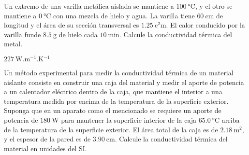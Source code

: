 \setcounter{figure}{0}
%
\begin{Exercise}
  {}{}
  Un extremo de una varilla metálica aislada se mantiene a $\SI{100}{\celsius}$, y el otro se mantiene a $\SI{0}{\celsius}$ con una mezcla de hielo y agua. La varilla tiene $\SI{60}{\centi\metre}$ de longitud y el área de su sección transversal es $\SI{1.25}{\square\centi\metre}$. El calor conducido por la varilla funde $\SI{8.5}{\gram}$ de hielo cada $\SI{10}{\minute}$. Calcule la conductividad térmica del metal.
\end{Exercise}
\begin{Answer}
  $\SI{227}{\watt.\metre^{-1}.\kelvin^{-1}}$
\end{Answer}
%
%
\begin{Exercise}
  Un método experimental para medir la conductividad térmica de un material aislante consiste en construir una caja del material y medir el aporte de potencia a un calentador eléctrico dentro de la caja, que mantiene el interior a una temperatura medida por encima de la temperatura de la superficie exterior. Suponga que en un aparato como el mencionado se requiere un aporte de potencia de $\SI{180}{\watt}$ para mantener la superficie interior de la caja $\SI{65.0}{\celsius}$ arriba de la temperatura de la superficie exterior. El área total de la caja es de $\SI{2.18}{\square\metre}$, y el espesor de la pared es de $\SI{3.90}{\centi\metre}$. Calcule la conductividad térmica del material en unidades del SI.
\end{Exercise}
